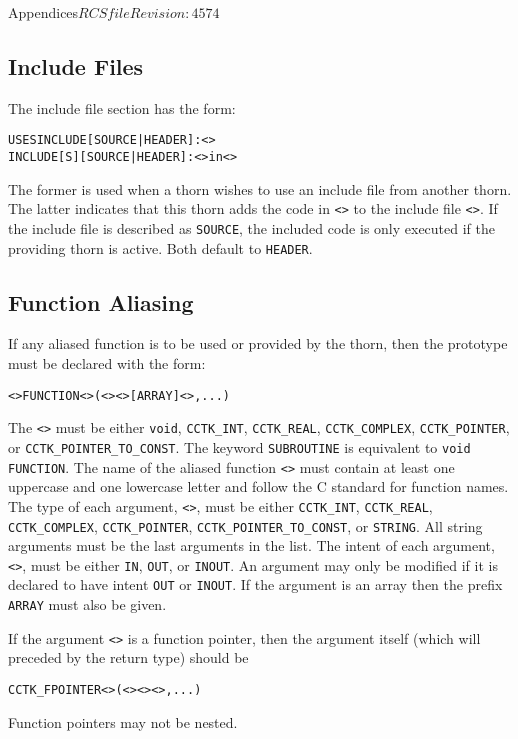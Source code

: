 \begin{cactuspart}{Appendices}{$RCSfile$}{$Revision: 4574 $}
\subsection{Include Files}
The include file section has the form:
\begin{alltt}
USES INCLUDE [SOURCE|HEADER]: <>
INCLUDE[S] [SOURCE|HEADER]: <> in <>
\end{alltt}
The former is used when a thorn wishes to use an include file from
another thorn.  The latter indicates that this thorn adds the code in
\texttt{<>} to the include file \texttt{<>}.  If
the include file is described as \verb|SOURCE|, the included code is
only executed if the providing thorn is active.
Both default to \verb|HEADER|.

\subsection{Function Aliasing}
\label{subsec:Appendix.interface.function_aliasing}
If any aliased function is to be used or provided by the thorn, then
the prototype must be declared with the form:
\begin{alltt}
<> FUNCTION <>(<> <> [ARRAY] <>, ...)
\end{alltt}
The \texttt{<>} must be either \verb|void|,
\verb|CCTK_INT|, \verb|CCTK_REAL|, \verb|CCTK_COMPLEX|,
\verb|CCTK_POINTER|, or \verb|CCTK_POINTER_TO_CONST|.  The keyword
\verb|SUBROUTINE| is equivalent to \verb|void FUNCTION|. The name of
the aliased function \texttt{<>} must contain at least one
uppercase and one lowercase letter and follow the C standard for
function names.  The type of each argument,
\texttt{<>}, must be either \verb|CCTK_INT|,
\verb|CCTK_REAL|, \verb|CCTK_COMPLEX|, \verb|CCTK_POINTER|,
\verb|CCTK_POINTER_TO_CONST|, or \verb|STRING|.  All string arguments
must be the last arguments in the list.  The intent of each argument,
\texttt{<>}, must be either \verb|IN|, \verb|OUT|, or
\verb|INOUT|.  An argument may only be modified if it is declared to
have intent \verb|OUT| or \verb|INOUT|.  If the argument is an array
then the prefix \verb|ARRAY| must also be given.

If the argument \texttt{<>} is a function pointer, then the argument
itself (which will preceded by the return type) should be
\begin{alltt}
CCTK_FPOINTER <>(<> <> <>, ...)
\end{alltt}
Function pointers may not be nested. 


\end{cactuspart}

